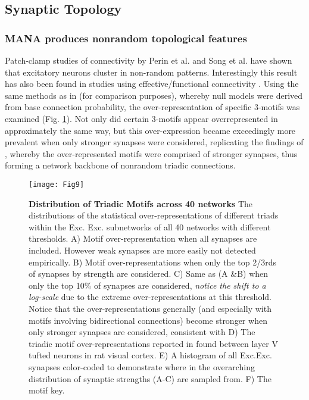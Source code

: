 \documentclass[10pt,letterpaper]{article}
\begin{document}
\subsection*{Synaptic Topology}

\subsubsection*{MANA produces nonrandom topological features}

Patch-clamp studies of connectivity by Perin et al.\cite{perin2011synaptic} and Song et al. \cite{song2005highly} have shown that excitatory neurons cluster in non-random patterns. Interestingly this result has also been found in studies using effective/functional connectivity \cite{shimono2015functional}. Using the same methods as in \cite{song2005highly} (for comparison purposes), whereby null models were derived from base connection probability, the over-representation of specific 3-motifs was examined (Fig. \ref{Fig9}). Not only did certain 3-motifs appear overrepresented in approximately the same way, but this over-expression became exceedingly more prevalent when only stronger synapses were considered, replicating the findings of \cite{song2005highly}, whereby the over-represented motifs were comprised of stronger synapses, thus forming a network backbone of nonrandom triadic connections.

\begin{figure}[!h]
	\centering
	\texttt{[image: Fig9]}
	\caption{{\bf Distribution of Triadic Motifs across 40 networks}
		The distributions of the statistical over-representations of different triads within the Exc. \textrightarrow Exc. subnetworks of all 40 networks with different thresholds. A) Motif over-representation when all synapses are included. However weak synapses are more easily not detected empirically. B) Motif over-representations when only the top 2/3rds of synapses by strength are considered. C) Same as (A \&B) when only the top 10\% of synapses are considered, \emph{notice the shift to a log-scale} due to the extreme over-representations at this threshold. Notice that the over-representations generally (and especially with motifs involving bidirectional connections) become stronger when only stronger synapses are considered, consistent with \cite{song2005highly} D) The triadic motif over-representations reported in \cite{song2005highly} found between layer V tufted neurons in rat visual cortex. E) A histogram of all Exc.\textrightarrow Exc. synapses color-coded to demonstrate where in the overarching distribution of synaptic strengths (A-C) are sampled from. F) The motif key. \footnotesize }
	\label{Fig9}
\end{figure}
\end{document}
